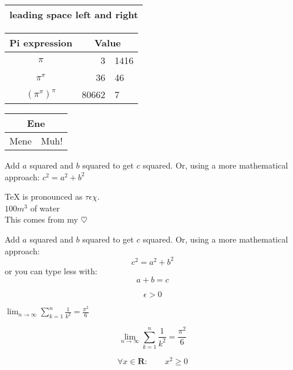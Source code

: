 \documentclass[a4paper,11pt]{book}
\begin{document}
	
	\begin{tabular}{l}
		\hline
		leading space left and right\\
		\hline
	\end{tabular}
	
	
	\begin{tabular}{c r @{.} l}
		Pi expression
		&
		\multicolumn{2}{c}{Value} \\
		\hline
		$\pi$
		& 3&1416 \\
		$\pi^{\pi}$
		& 36&46
		\\
		$(\pi^{\pi})^{\pi}$ & 80662&7 \\
	\end{tabular}
	
	
	\begin{tabular}{|c|c|}
		\hline
		\multicolumn{2}{|c|}{Ene} \\
		\hline
		Mene & Muh! \\
		\hline
	\end{tabular}
	
	Add $a$ squared and $b$ squared
	to get $c$ squared. Or, using
	a more mathematical approach:
	$c^{2}=a^{2}+b^{2}$

	\TeX{} is pronounced as
	\(\tau\epsilon\chi\).\\[6pt]
	$100 m^{3}$ of water\\[6pt]
	This comes from my
	\begin{math}\heartsuit\end{math}
	
	
	Add $a$ squared and $b$ squared
	to get $c$ squared. Or, using
	a more mathematical approach:
	\begin{displaymath}
	c^{2}=a^{2}+b^{2}
	\end{displaymath}
	or you can type less with:
	\[a+b=c\]
	
	
	\begin{equation} \label{eq:eps}
	\epsilon > 0
	\end{equation}
	

	
	$\lim_{n \to \infty}
	\sum_{k=1}^n \frac{1}{k^2}
	= \frac{\pi^2}{6}$
	
	
	\begin{displaymath}
	\lim_{n \to \infty}
	\sum_{k=1}^n \frac{1}{k^2}
	= \frac{\pi^2}{6}
	\end{displaymath}
	
	
	\begin{equation}
	\forall x \in \mathbf{R}:
	\qquad x^{2} \geq 0
	\end{equation}
	
\end{document}
